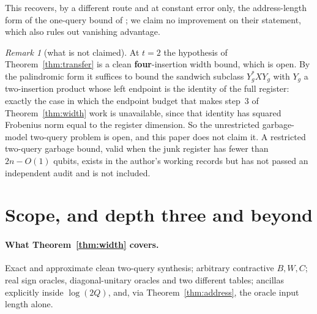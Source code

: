\documentclass[11pt,a4paper]{article}
\theoremstyle{plain}
\theoremstyle{definition}
\theoremstyle{remark}
\newtheorem{remark}[theorem]{Remark}
\begin{document}
This recovers, by a different route and at constant error only, the address-length form of
the one-query bound of \cite{LMW24}; we claim no improvement on their statement, which also
rules out vanishing advantage.

\begin{remark}[what is not claimed]\label{rem:notclaimed}
At $t=2$ the hypothesis of Theorem~\ref{thm:transfer} is a clean \textbf{four}-insertion
width bound, which is open. By the palindromic form it suffices to bound the sandwich
subclass $Y_g^{*}XY_g$ with $Y_g$ a two-insertion product whose left endpoint is the identity
of the full register: exactly the case in which the endpoint budget that makes step~3 of
Theorem~\ref{thm:width} work is unavailable, since that identity has squared Frobenius norm
equal to the register dimension. So the unrestricted garbage-model two-query problem is
open, and this paper does not claim it. A restricted two-query garbage bound, valid when the
junk register has fewer than $2n-O(1)$ qubits, exists in the author's working records but
has not passed an independent audit and is not included.
\end{remark}

\section{Scope, and depth three and beyond}\label{sec:scope}

\paragraph{What Theorem~\ref{thm:width} covers.} Exact and approximate clean two-query
synthesis; arbitrary contractive $B,W,C$; real sign oracles, diagonal-unitary oracles and two
different tables; ancillas explicitly inside $\log(2Q)$, and, via Theorem~\ref{thm:address},
the oracle input length alone.
\end{document}
